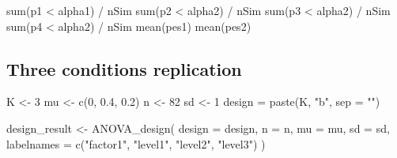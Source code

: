 \documentclass[
]{book}
\newenvironment{Shaded}{\begin{snugshade}}{\end{snugshade}}
\newcommand{\AttributeTok}[1]{\textcolor[rgb]{0.77,0.63,0.00}{#1}}
\newcommand{\DecValTok}[1]{\textcolor[rgb]{0.00,0.00,0.81}{#1}}
\newcommand{\FloatTok}[1]{\textcolor[rgb]{0.00,0.00,0.81}{#1}}
\newcommand{\FunctionTok}[1]{\textcolor[rgb]{0.00,0.00,0.00}{#1}}
\newcommand{\NormalTok}[1]{#1}
\newcommand{\OtherTok}[1]{\textcolor[rgb]{0.56,0.35,0.01}{#1}}
\newcommand{\SpecialCharTok}[1]{\textcolor[rgb]{0.00,0.00,0.00}{#1}}
\newcommand{\StringTok}[1]{\textcolor[rgb]{0.31,0.60,0.02}{#1}}
\begin{document}
\begin{Shaded}
\begin{Highlighting}[]
\FunctionTok{sum}\NormalTok{(p1 }\SpecialCharTok{\textless{}}\NormalTok{ alpha1) }\SpecialCharTok{/}\NormalTok{ nSim}
\FunctionTok{sum}\NormalTok{(p2 }\SpecialCharTok{\textless{}}\NormalTok{ alpha2) }\SpecialCharTok{/}\NormalTok{ nSim}
\FunctionTok{sum}\NormalTok{(p3 }\SpecialCharTok{\textless{}}\NormalTok{ alpha2) }\SpecialCharTok{/}\NormalTok{ nSim}
\FunctionTok{sum}\NormalTok{(p4 }\SpecialCharTok{\textless{}}\NormalTok{ alpha2) }\SpecialCharTok{/}\NormalTok{ nSim}
\FunctionTok{mean}\NormalTok{(pes1)}
\FunctionTok{mean}\NormalTok{(pes2)}
\end{Highlighting}
\end{Shaded}

\hypertarget{three-conditions-replication-2}{%
\subsection{Three conditions replication}\label{three-conditions-replication-2}}

\begin{Shaded}
\begin{Highlighting}[]
\NormalTok{K }\OtherTok{\textless{}{-}} \DecValTok{3}
\NormalTok{mu }\OtherTok{\textless{}{-}} \FunctionTok{c}\NormalTok{(}\DecValTok{0}\NormalTok{, }\FloatTok{0.4}\NormalTok{, }\FloatTok{0.2}\NormalTok{)}
\NormalTok{n }\OtherTok{\textless{}{-}} \DecValTok{82}
\NormalTok{sd }\OtherTok{\textless{}{-}} \DecValTok{1}
\NormalTok{design }\OtherTok{=} \FunctionTok{paste}\NormalTok{(K, }\StringTok{"b"}\NormalTok{, }\AttributeTok{sep =} \StringTok{""}\NormalTok{)}
\end{Highlighting}
\end{Shaded}

\begin{Shaded}
\begin{Highlighting}[]
\NormalTok{design\_result }\OtherTok{\textless{}{-}} \FunctionTok{ANOVA\_design}\NormalTok{(}
  \AttributeTok{design =}\NormalTok{ design,}
  \AttributeTok{n =}\NormalTok{ n,}
  \AttributeTok{mu =}\NormalTok{ mu,}
  \AttributeTok{sd =}\NormalTok{ sd,}
  \AttributeTok{labelnames =} \FunctionTok{c}\NormalTok{(}\StringTok{"factor1"}\NormalTok{, }\StringTok{"level1"}\NormalTok{, }\StringTok{"level2"}\NormalTok{, }\StringTok{"level3"}\NormalTok{)}
\NormalTok{  )}
\end{Highlighting}
\end{Shaded}
\end{document}
